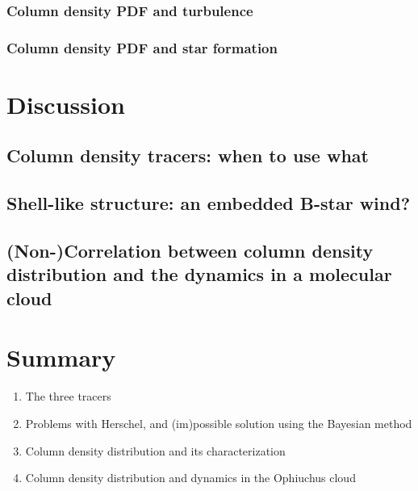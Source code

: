 \documentclass[11pt,a4paper]{emulateapj}
\begin{document}
\subsubsection{Column density PDF and turbulence}

\subsubsection{Column density PDF and star formation}

\section{Discussion}
\label{sec:discussion}

\subsection{Column density tracers: when to use what}

\subsection{Shell-like structure: an embedded B-star wind?}

\subsection{(Non-)Correlation between column density distribution and the dynamics in a molecular cloud}

\section{Summary}
\label{sec:summary}

\begin{enumerate}
\item The three tracers
\item Problems with Herschel, and (im)possible solution using the Bayesian method
\item Column density distribution and its characterization
\item Column density distribution and dynamics in the Ophiuchus cloud
\end{enumerate}

%



\end{document}
